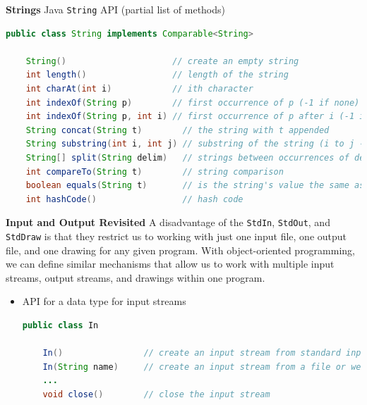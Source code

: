\documentclass[8pt,a4paper,compress]{beamer}
\begin{document}
\begin{frame}[fragile]
\pause

\textbf{Strings} Java \lstinline$String$ API (partial list of methods)

\begin{lstlisting}[language=Java]
public class String implements Comparable<String>

    String()                     // create an empty string
    int length()                 // length of the string
    int charAt(int i)            // ith character
    int indexOf(String p)        // first occurrence of p (-1 if none)
    int indexOf(String p, int i) // first occurrence of p after i (-1 if none)
    String concat(String t)        // the string with t appended
    String substring(int i, int j) // substring of the string (i to j - 1)
    String[] split(String delim)   // strings between occurrences of delim
    int compareTo(String t)        // string comparison
    boolean equals(String t)       // is the string's value the same as t's?
    int hashCode()                 // hash code
\end{lstlisting}

\pause
\smallskip

\textbf{Input and Output Revisited} A disadvantage of the \lstinline$StdIn$, \lstinline$StdOut$, and \lstinline$StdDraw$ is that they restrict us to working with just one input file, one output file, and one drawing for any given program. With object-oriented programming, we can define similar mechanisms that allow us to work with multiple input streams, output streams, and drawings within one program.

\begin{itemize}
\pause

\item API for a data type for input streams

\begin{lstlisting}[language=Java]
public class In

    In()                // create an input stream from standard input
    In(String name)     // create an input stream from a file or website
    ...
    void close()        // close the input stream
\end{lstlisting}

\end{itemize}
\end{frame}
\end{document}
